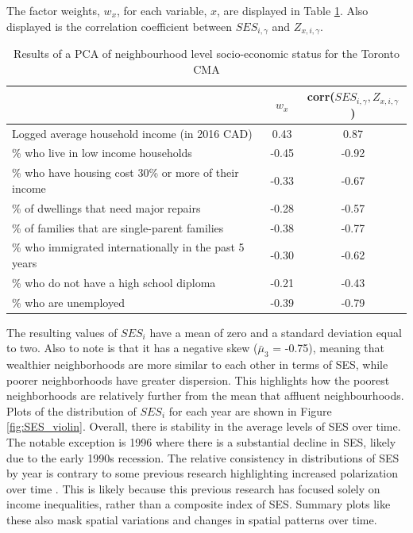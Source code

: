 The factor weights, $w_x$, for each variable, $x$, are displayed in Table \ref{table:pca}. Also displayed is the correlation coefficient between $SES_{i,\gamma}$ and $Z_{x,i,\gamma}$. 


\begin{table}[H]
	\small
	\centering
	\caption{{Results of a PCA of neighbourhood level socio-economic status for the Toronto CMA}}
	\label{table:pca}
	\begin{tabular}{lcc}
		
		\hline
		& $w_x$     & corr($SES_{i,\gamma}, Z_{x,i,\gamma}$)   \\
		\hline
		Logged average household income (in 2016 CAD)  & 0.43 & 0.87 \\
		\% who live in low income households     & -0.45  & -0.92  \\
		
		\% who have housing cost 30\% or more of their income & -0.33  & -0.67  \\
		\% of dwellings that need major repairs    & -0.28  & -0.57  \\
		\% of families that are single-parent families     & -0.38  & -0.77  \\
		\% who immigrated internationally in the past 5 years    & -0.30  & -0.62  \\
		\% who do not have a high school diploma  & -0.21  & -0.43  \\
		\% who are unemployed   & -0.39  & -0.79 \\
		\hline
	\end{tabular}
\end{table}

The resulting values of $SES_i$ have a mean of zero and a standard deviation equal to two. Also to note is that it has a negative skew ($\bar{\mu}_3$ = -0.75), meaning that wealthier neighborhoods are more similar to each other in terms of SES, while poorer neighborhoods have greater dispersion. This highlights how the poorest neighborhoods are relatively further from the mean that affluent neighbourhoods. Plots of the distribution of $SES_i$ for each year are shown in Figure \ref{fig:SES_violin}. Overall, there is stability in the average levels of SES over time. The notable exception is 1996 where there is a substantial decline in SES, likely due to the early 1990s recession. The relative consistency in distributions of SES by year is contrary to some previous research highlighting increased polarization over time \cite{hulchanski_three_2010}. This is likely because this previous research has focused solely on income inequalities, rather than a composite index of SES. Summary plots like these also mask spatial variations and changes in spatial patterns over time.






